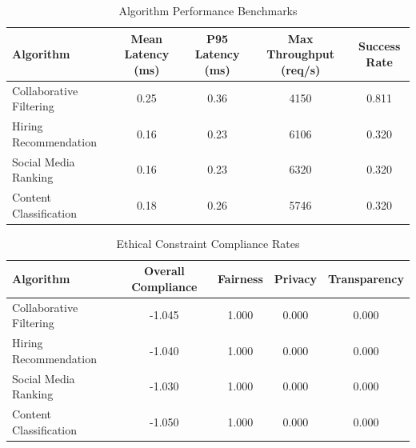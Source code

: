 \begin{table}[htbp]
\centering
\caption{Algorithm Performance Benchmarks}
\label{tab:performance}
\begin{tabular}{lcccc}
\toprule
Algorithm & Mean Latency (ms) & P95 Latency (ms) & Max Throughput (req/s) & Success Rate \\
\midrule
Collaborative Filtering & 0.25 & 0.36 & 4150 & 0.811 \\
Hiring Recommendation & 0.16 & 0.23 & 6106 & 0.320 \\
Social Media Ranking & 0.16 & 0.23 & 6320 & 0.320 \\
Content Classification & 0.18 & 0.26 & 5746 & 0.320 \\
\bottomrule
\end{tabular}
\end{table}

\begin{table}[htbp]
\centering
\caption{Ethical Constraint Compliance Rates}
\label{tab:compliance}
\begin{tabular}{lcccc}
\toprule
Algorithm & Overall Compliance & Fairness & Privacy & Transparency \\
\midrule
Collaborative Filtering & -1.045 & 1.000 & 0.000 & 0.000 \\
Hiring Recommendation & -1.040 & 1.000 & 0.000 & 0.000 \\
Social Media Ranking & -1.030 & 1.000 & 0.000 & 0.000 \\
Content Classification & -1.050 & 1.000 & 0.000 & 0.000 \\
\bottomrule
\end{tabular}
\end{table}
